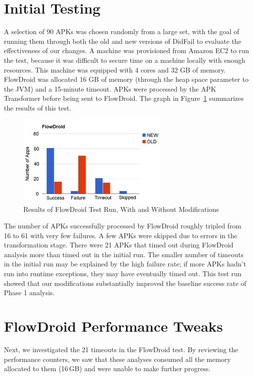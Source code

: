 \section{Initial Testing}
A selection of 90 APKs was chosen randomly from a large set, with the goal of running them through both the old and new versions of DidFail to evaluate the effectiveness of our changes.  A machine was provisioned from Amazon EC2 to run the test, because it was difficult to secure time on a machine locally with enough resources.  This machine was equipped with 4 cores and 32 GB of memory.  FlowDroid was allocated 16 GB of memory (through the heap space parameter to the JVM) and a 15-minute timeout.  APKs were processed by the APK Transformer before being sent to FlowDroid.  The graph in Figure~\ref{fig:initial_phase1} summarizes the results of this test.

\begin{figure}[h]
	\centering
	\begin{minipage}{0.85\textwidth}
	\centering
	\includegraphics[width=0.66\textwidth]{flowdroid_success2.png}
	\caption[Results of FlowDroid Test Run on 90 Apps, With and Without Modifications]{Results of FlowDroid Test Run, With and Without Modifications}
	\label{fig:initial_phase1}
	\end{minipage}
\end{figure}

The number of APKs successfully processed by FlowDroid roughly tripled from 16 to 61 with very few failures. A few APKs were skipped due to errors in the transformation stage. There were 21 APKs that timed out during FlowDroid analysis more than timed out in the initial run.  The smaller number of timeouts in the initial run may be explained by the high failure rate; if more APKs hadn't run into runtime exceptions, they may have eventually timed out.  This test run showed that our modifications substantially improved the baseline success rate of Phase 1 analysis.

\section{FlowDroid Performance Tweaks}
Next, we investigated the 21 timeouts in the FlowDroid test.  By reviewing the performance counters, we saw that these analyses consumed all the memory allocated to them (16\,GB) and were unable to make further progress.

